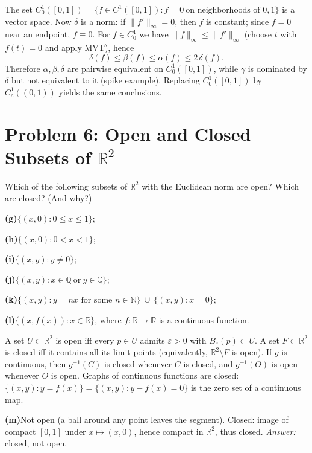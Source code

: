 \begin{problem}[CP-II-0471]
The set $C^1_0([0,1])=\{f\in C^1([0,1]): f=0\ \text{on neighborhoods of }0,1\}$ is a vector space.
Now $\delta$ is a norm: if $\|f'\|_\infty=0$, then $f$ is constant; since $f=0$ near an endpoint,
$f\equiv0$. For $f\in C^1_0$ we have $\|f\|_\infty\le \|f'\|_\infty$ (choose $t$ with $f(t)=0$ and apply MVT),
hence
\[
\delta(f)\le \beta(f)\le \alpha(f)\le 2\,\delta(f).
\]
Therefore $\alpha,\beta,\delta$ are pairwise equivalent on $C^1_0([0,1])$, while $\gamma$
is dominated by $\delta$ but not equivalent to it (spike example).
Replacing $C^1_0([0,1])$ by $C^1_c((0,1))$ yields the same conclusions.

\section*{Problem 6: Open and Closed Subsets of $\mathbb{R}^2$}

Which of the following subsets of $\mathbb{R}^2$ with the Euclidean norm are open? Which are closed? (And why?)

	\par\smallskip\noindent\textbf{(g)}\quad $\{(x,0): 0\le x\le 1\}$;
	\par\smallskip\noindent\textbf{(h)}\quad $\{(x,0): 0< x< 1\}$;
	\par\smallskip\noindent\textbf{(i)}\quad $\{(x,y): y\ne 0\}$;
	\par\smallskip\noindent\textbf{(j)}\quad $\{(x,y): x\in\mathbb{Q}\ \text{or}\ y\in\mathbb{Q}\}$;
	\par\smallskip\noindent\textbf{(k)}\quad $\{(x,y): y=nx \text{ for some } n\in\mathbb{N}\}\ \cup\ \{(x,y): x=0\}$;
	\par\smallskip\noindent\textbf{(l)}\quad $\{(x,f(x)) : x\in\mathbb{R}\}$, where $f:\mathbb{R}\to\mathbb{R}$ is a continuous function.

A set $U\subset\mathbb{R}^2$ is open iff every $p\in U$ admits $\varepsilon>0$ with $B_\varepsilon(p)\subset U$.
A set $F\subset\mathbb{R}^2$ is closed iff it contains all its limit points (equivalently, $\mathbb{R}^2\setminus F$ is open).
If $g$ is continuous, then $g^{-1}(C)$ is closed whenever $C$ is closed, and $g^{-1}(O)$ is open whenever $O$ is open.
Graphs of continuous functions are closed: $\{(x,y): y=f(x)\}=\{(x,y): y-f(x)=0\}$ is the zero set of a continuous map.

	\par\smallskip\noindent\textbf{(m)}\quad Not open (a ball around any point leaves the segment). Closed: image of compact $[0,1]$ under $x\mapsto(x,0)$, hence compact in $\mathbb{R}^2$, thus closed. \emph{Answer:} closed, not open.


\end{problem}
